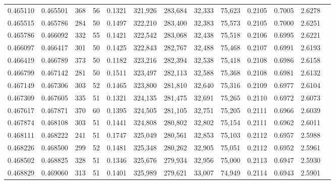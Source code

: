 \begin{tabular}{rrrrrrrrrrrrr}
0.465110 & 0.465501 &   368 &  56 &                                     0.1321 & 321,926 & 283,684 &  32,333 &  75,623 & 0.2105 & 0.7005 & 2.6278 \\
0.465515 & 0.465786 &   284 &  50 &                                     0.1497 & 322,210 & 283,400 &  32,383 &  75,573 & 0.2105 & 0.7000 & 2.6251 \\
0.465786 & 0.466092 &   332 &  55 &                                     0.1421 & 322,542 & 283,068 &  32,438 &  75,518 & 0.2106 & 0.6995 & 2.6221 \\
0.466097 & 0.466417 &   301 &  50 &                                     0.1425 & 322,843 & 282,767 &  32,488 &  75,468 & 0.2107 & 0.6991 & 2.6193 \\
0.466419 & 0.466789 &   373 &  50 &                                     0.1182 & 323,216 & 282,394 &  32,538 &  75,418 & 0.2108 & 0.6986 & 2.6158 \\
0.466799 & 0.467142 &   281 &  50 &                                     0.1511 & 323,497 & 282,113 &  32,588 &  75,368 & 0.2108 & 0.6981 & 2.6132 \\
0.467149 & 0.467306 &   303 &  52 &                                     0.1465 & 323,800 & 281,810 &  32,640 &  75,316 & 0.2109 & 0.6977 & 2.6104 \\
0.467309 & 0.467605 &   335 &  51 &                                     0.1321 & 324,135 & 281,475 &  32,691 &  75,265 & 0.2110 & 0.6972 & 2.6073 \\
0.467617 & 0.467871 &   370 &  60 &                                     0.1395 & 324,505 & 281,105 &  32,751 &  75,205 & 0.2111 & 0.6966 & 2.6039 \\
0.467874 & 0.468108 &   303 &  51 &                                     0.1441 & 324,808 & 280,802 &  32,802 &  75,154 & 0.2111 & 0.6962 & 2.6011 \\
0.468111 & 0.468222 &   241 &  51 &                                     0.1747 & 325,049 & 280,561 &  32,853 &  75,103 & 0.2112 & 0.6957 & 2.5988 \\
0.468226 & 0.468500 &   299 &  52 &                                     0.1481 & 325,348 & 280,262 &  32,905 &  75,051 & 0.2112 & 0.6952 & 2.5961 \\
0.468502 & 0.468825 &   328 &  51 &                                     0.1346 & 325,676 & 279,934 &  32,956 &  75,000 & 0.2113 & 0.6947 & 2.5930 \\
0.468829 & 0.469060 &   313 &  51 &                                     0.1401 & 325,989 & 279,621 &  33,007 &  74,949 & 0.2114 & 0.6943 & 2.5901 \\

\end{tabular}
